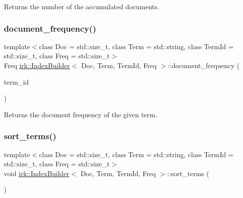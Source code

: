 Returns the number of the accumulated documents. 

\mbox{\label{classirk_1_1IndexBuilder_aa6802667d290644301234742a7aacced}} 
\subsubsection{\texorpdfstring{document\+\_\+frequency()}{document\_frequency()}}
{\footnotesize\ttfamily template$<$class Doc  = std\+::size\+\_\+t, class Term  = std\+::string, class Term\+Id  = std\+::size\+\_\+t, class Freq  = std\+::size\+\_\+t$>$ \\
Freq \mbox{\hyperlink{classirk_1_1IndexBuilder}{irk\+::\+Index\+Builder}}$<$ Doc, Term, Term\+Id, Freq $>$\+::document\+\_\+frequency (\begin{DoxyParamCaption}\item[{Term\+Id}]{term\+\_\+id }\end{DoxyParamCaption})\hspace{0.3cm}{\ttfamily [inline]}}



Returns the document frequency of the given term. 

\mbox{\label{classirk_1_1IndexBuilder_a46adff8832139dd3b43d53916d4f36a7}} 
\subsubsection{\texorpdfstring{sort\+\_\+terms()}{sort\_terms()}}
{\footnotesize\ttfamily template$<$class Doc  = std\+::size\+\_\+t, class Term  = std\+::string, class Term\+Id  = std\+::size\+\_\+t, class Freq  = std\+::size\+\_\+t$>$ \\
void \mbox{\hyperlink{classirk_1_1IndexBuilder}{irk\+::\+Index\+Builder}}$<$ Doc, Term, Term\+Id, Freq $>$\+::sort\+\_\+terms (\begin{DoxyParamCaption}{ }\end{DoxyParamCaption})\hspace{0.3cm}{\ttfamily [inline]}}



